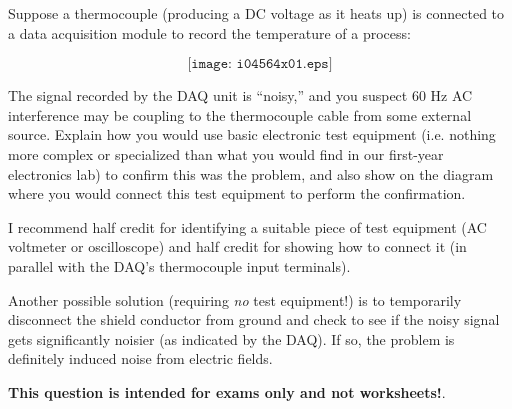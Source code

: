

Suppose a thermocouple (producing a DC voltage as it heats up) is connected to a data acquisition module to record the temperature of a process:

$$\texttt{[image: i04564x01.eps]}$$

The signal recorded by the DAQ unit is ``noisy,'' and you suspect 60 Hz AC interference may be coupling to the thermocouple cable from some external source.  Explain how you would use basic electronic test equipment (i.e. nothing more complex or specialized than what you would find in our first-year electronics lab) to confirm this was the problem, and also show on the diagram where you would connect this test equipment to perform the confirmation.







I recommend half credit for identifying a suitable piece of test equipment (AC voltmeter or oscilloscope) and half credit for showing how to connect it (in parallel with the DAQ's thermocouple input terminals).

\vskip 10pt

Another possible solution (requiring {\it no} test equipment!) is to temporarily disconnect the shield conductor from ground and check to see if the noisy signal gets significantly noisier (as indicated by the DAQ).  If so, the problem is definitely induced noise from electric fields.







{\bf This question is intended for exams only and not worksheets!}.


